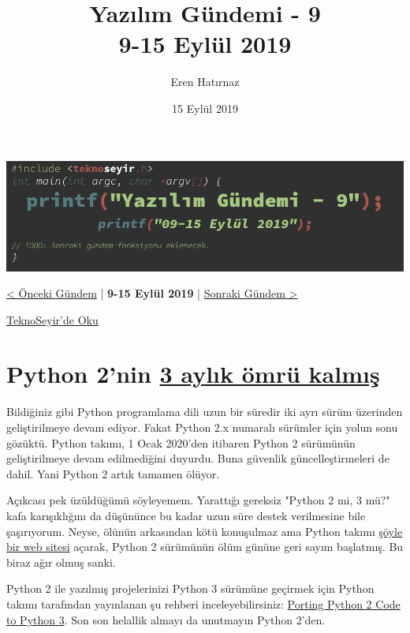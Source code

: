 \documentclass[11pt]{article}
\author{Eren Hatırnaz}
\date{15 Eylül 2019}
\title{Yazılım Gündemi - 9\\\medskip
\large 9-15 Eylül 2019}
\begin{document}
\maketitle
\tableofcontents \clearpage\shorthandoff{=}

\begin{center}
\includegraphics[width=.9\linewidth]{gorseller/yazilim-gundemi-banner.png}
\end{center}

\begin{center}
\href{../08/yazilim-gundemi-08.pdf}{< Önceki Gündem} | \textbf{9-15 Eylül 2019} | \href{../10/yazilim-gundemi-10.pdf}{Sonraki Gündem >}

\href{https://teknoseyir.com/blog/yazilim-gundemi-9-9-15-eylul-2019}{TeknoSeyir'de Oku}
\end{center}

\section{Python 2'nin \href{https://www.python.org/doc/sunset-python-2/}{3 aylık ömrü kalmış}}
\label{sec:org2f66379}
Bildiğiniz gibi Python programlama dili uzun bir süredir iki ayrı sürüm
üzerinden geliştirilmeye devam ediyor. Fakat Python 2.x numaralı sürümler için
yolun sonu gözüktü. Python takımı, 1 Ocak 2020'den itibaren Python 2 sürümünün
geliştirilmeye devam edilmediğini duyurdu. Buna güvenlik güncelleştirmeleri de
dahil. Yani Python 2 artık tamamen ölüyor.

Açıkcası pek üzüldüğümü söyleyemem. Yarattığı gereksiz "Python 2 mi, 3 mü?"
kafa karışıklığını da düşününce bu kadar uzun süre destek verilmesine bile
şaşırıyorum. Neyse, ölünün arkasından kötü konuşulmaz ama Python takımı \href{https://pythonclock.org/}{şöyle
bir web sitesi} açarak, Python 2 sürümünün ölüm gününe geri sayım başlatmış. Bu
biraz ağır olmuş sanki.

Python 2 ile yazılmış projelerinizi Python 3 sürümüne geçirmek için Python
takımı tarafından yayınlanan şu rehberi inceleyebilirsiniz: \href{https://docs.python.org/3/howto/pyporting.html}{Porting Python 2
Code to Python 3}. Son son helallik almayı da unutmayın Python 2'den.
\end{document}
